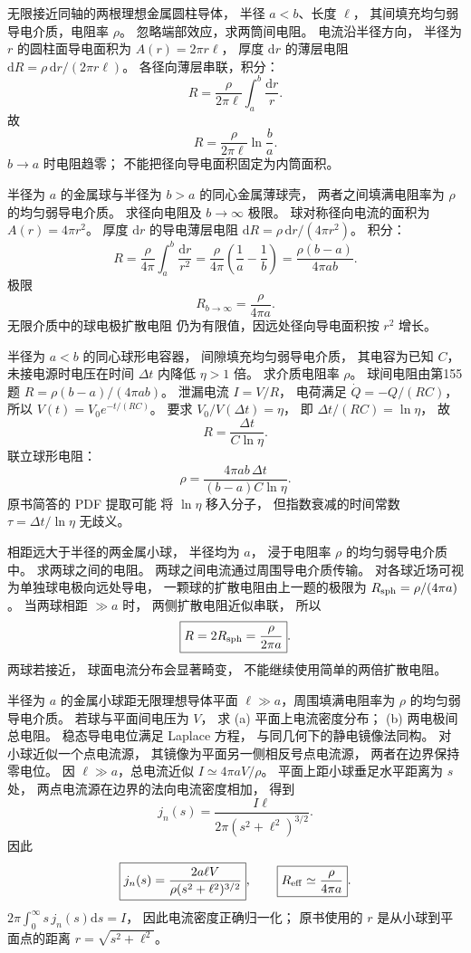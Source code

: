 无限接近同轴的两根理想金属圆柱导体，
半径 $a<b$、长度 $\ell$，
其间填充均匀弱导电介质，电阻率 $\rho$。
忽略端部效应，求两筒间电阻。
\exsolution
电流沿半径方向，
半径为 $r$ 的圆柱面导电面积为
$A(r)=2\pi r\ell$，
厚度 $\mathrm dr$ 的薄层电阻
$\mathrm dR=\rho\,\mathrm dr/(2\pi r\ell)$。
各径向薄层串联，积分：
\[
R=\frac{\rho}{2\pi\ell}
\int_a^b\frac{\mathrm dr}r.
\]
故
\[
\boxed{R=\frac{\rho}{2\pi\ell}\ln\frac ba}.
\]
\excheck $b\to a$ 时电阻趋零；
不能把径向导电面积固定为内筒面积。

半径为 $a$ 的金属球与半径为
$b>a$ 的同心金属薄球壳，
两者之间填满电阻率为 $\rho$
的均匀弱导电介质。
求径向电阻及 $b\to\infty$ 极限。
\exsolution
球对称径向电流的面积为
$A(r)=4\pi r^2$。
厚度 $\mathrm dr$ 的导电薄层电阻
$\mathrm dR=\rho\,\mathrm dr/(4\pi r^2)$。
积分：
\[
R=\frac{\rho}{4\pi}\int_a^b\frac{\mathrm dr}{r^2}
=\boxed{\frac{\rho}{4\pi}
\left(\frac1a-\frac1b\right)
=\frac{\rho(b-a)}{4\pi ab}}.
\]
极限
\[
\boxed{R_{b\to\infty}=\frac{\rho}{4\pi a}}.
\]
\excheck 无限介质中的球电极扩散电阻
仍为有限值，因远处径向导电面积按 $r^2$ 增长。

半径为 $a<b$ 的同心球形电容器，
间隙填充均匀弱导电介质，
其电容为已知 $C$，
未接电源时电压在时间 $\Delta t$
内降低 $\eta>1$ 倍。
求介质电阻率 $\rho$。
\exsolution
球间电阻由第155题
$R=\rho(b-a)/(4\pi ab)$。
泄漏电流
$I=V/R$，
电荷满足
$\dot Q=-Q/(RC)$，
所以
$V(t)=V_0e^{-t/(RC)}$。
要求
$V_0/V(\Delta t)=\eta$，
即
$\Delta t/(RC)=\ln\eta$，
故
\[
R=\frac{\Delta t}{C\ln\eta}.
\]
联立球形电阻：
\[
\boxed{\rho=
\frac{4\pi ab\,\Delta t}
{(b-a)C\ln\eta}}.
\]
\excheck 原书简答的 PDF 提取可能
将 $\ln\eta$ 移入分子，
但指数衰减的时间常数
$\tau=\Delta t/\ln\eta$ 无歧义。

相距远大于半径的两金属小球，
半径均为 $a$，
浸于电阻率 $\rho$ 的均匀弱导电介质中。
求两球之间的电阻。
\exsolution
两球之间电流通过周围导电介质传输。
对各球近场可视为单独球电极向远处导电，
一颗球的扩散电阻由上一题的极限为
$R_{\rm sph}=\rho/(4\pi a)$。
当两球相距 $\gg a$ 时，
两侧扩散电阻近似串联，
所以
\[
\boxed{R=2R_{\rm sph}=
\frac{\rho}{2\pi a}}.
\]
\excheck 两球若接近，
球面电流分布会显著畸变，
不能继续使用简单的两倍扩散电阻。

半径为 $a$ 的金属小球距无限理想导体平面
$\ell\gg a$，周围填满电阻率为 $\rho$
的均匀弱导电介质。
若球与平面间电压为 $V$，
求 (a) 平面上电流密度分布；
(b) 两电极间总电阻。
\exsolution
稳态导电电位满足 Laplace 方程，
与同几何下的静电镜像法同构。
对小球近似一个点电流源，
其镜像为平面另一侧相反号点电流源，
两者在边界保持零电位。
因 $\ell\gg a$，总电流近似
$I\simeq4\pi aV/\rho$。
平面上距小球垂足水平距离为 $s$ 处，
两点电流源在边界的法向电流密度相加，
得到
\[
j_n(s)=\frac{I\ell}
{2\pi(s^2+\ell^2)^{3/2}}.
\]
因此
\[
\boxed{j_n(s)=
\frac{2a\ell V}
{\rho(s^2+\ell^2)^{3/2}}},
\qquad
\boxed{R_{\rm eff}\simeq\frac{\rho}{4\pi a}}.
\]
\excheck $2\pi\int_0^\infty s\,j_n(s)\mathrm ds=I$，
因此电流密度正确归一化；
原书使用的 $r$ 是从小球到平面点的距离
$r=\sqrt{s^2+\ell^2}$。

